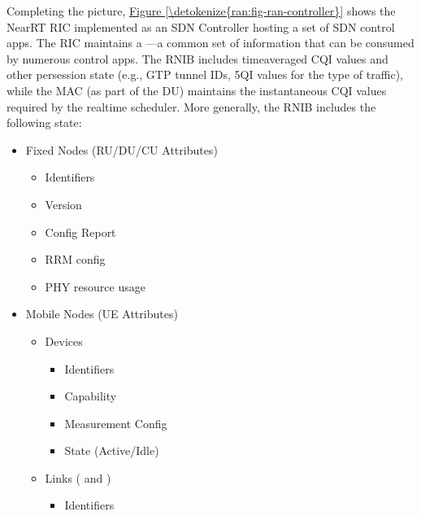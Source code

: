 \documentclass[a4paper,11pt,english]{sphinxmanual}
\begin{document}
\sphinxAtStartPar
Completing the picture, \hyperref[\detokenize{ran:fig-ran-controller}]{Figure \ref{\detokenize{ran:fig-ran-controller}}} shows
the Near\sphinxhyphen{}RT RIC implemented as an SDN Controller hosting a set of SDN
control apps. The RIC maintains a —a common set of information that can be consumed by numerous
control apps. The R\sphinxhyphen{}NIB includes time\sphinxhyphen{}averaged CQI values and other
per\sphinxhyphen{}session state (e.g., GTP tunnel IDs, 5QI values for the type of
traffic), while the MAC (as part of the DU) maintains the
instantaneous CQI values required by the real\sphinxhyphen{}time scheduler. More
generally, the R\sphinxhyphen{}NIB includes the following state:
\begin{itemize}
\item {} 
\sphinxAtStartPar
Fixed Nodes (RU/DU/CU Attributes)
\begin{itemize}
\item {} 
\sphinxAtStartPar
Identifiers

\item {} 
\sphinxAtStartPar
Version

\item {} 
\sphinxAtStartPar
Config Report

\item {} 
\sphinxAtStartPar
RRM config

\item {} 
\sphinxAtStartPar
PHY resource usage

\end{itemize}

\item {} 
\sphinxAtStartPar
Mobile Nodes (UE Attributes)
\begin{itemize}
\item {} 
\sphinxAtStartPar
Devices
\begin{itemize}
\item {} 
\sphinxAtStartPar
Identifiers

\item {} 
\sphinxAtStartPar
Capability

\item {} 
\sphinxAtStartPar
Measurement Config

\item {} 
\sphinxAtStartPar
State (Active/Idle)

\end{itemize}

\item {} 
\sphinxAtStartPar
Links ( and )
\begin{itemize}
\item {} 
\sphinxAtStartPar
Identifiers


\end{itemize}
\end{itemize}
\end{itemize}
\end{document}
